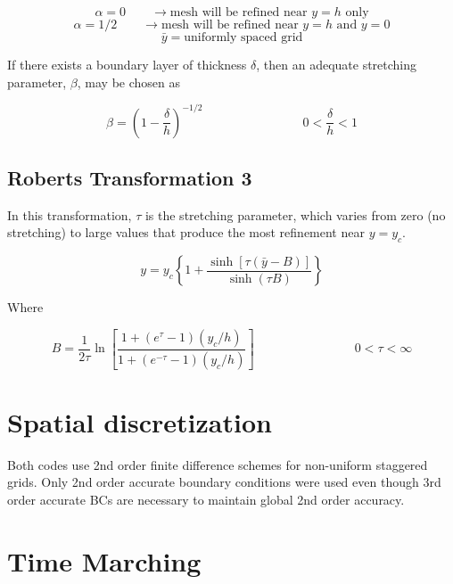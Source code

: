\documentclass[11pt]{article}
\begin{document}
\begin{equation}
	\alpha = 0 \qquad \rightarrow \text{mesh will be refined near $y=h$ only}
\end{equation}
\begin{equation}
	\alpha = 1/2 \qquad \rightarrow \text{mesh will be refined near $y=h$ and $y=0$}
\end{equation}
\begin{equation}
	\bar{y} = \text{uniformly spaced grid}
\end{equation}

If there exists a boundary layer of thickness $\delta$, then an adequate stretching parameter, $\beta$, may be chosen as

\begin{equation}
	\beta = \left( 1 - \frac{\delta}{h} \right)^{-1/2}
	\qquad \qquad
	\qquad \qquad
	0 < \frac{\delta}{h} < 1
\end{equation}


\subsection{Roberts Transformation 3}
In this transformation, $\tau$ is the stretching parameter, which varies from zero (no stretching) to large values that produce the most refinement near $y=y_c$.

\begin{equation}
	y
	=
	y_c
	\left\{
	1
	+
	\frac{\sinh[\tau (\bar{y}-B)]}
	{\sinh(\tau B)}
	\right\}
\end{equation}

Where

\begin{equation}
	B
	=
	\frac{1}{2\tau}
	\ln 
	\left[
	\frac{1+(e^\tau-1) (y_c/h)}{1+(e^{-\tau}-1) (y_c/h)}
	\right]
	\qquad \qquad \qquad \qquad
	0 <\tau < \infty
\end{equation}


\section{Spatial discretization}
Both codes use 2nd order finite difference schemes for non-uniform staggered grids. Only 2nd order accurate boundary conditions were used even though 3rd order accurate BCs are necessary to maintain global 2nd order accuracy.

\section{Time Marching}
\end{document}
